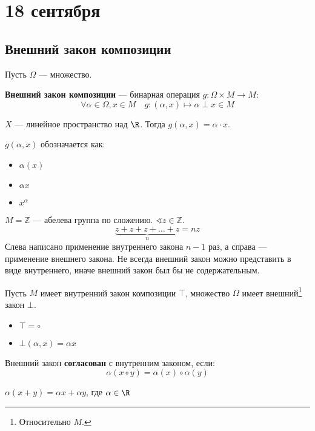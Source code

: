 \chapter{18 сентября}

\section{Внешний закон композиции}

Пусть \(\Omega\) --- множество.
\begin{definition}
    \textbf{Внешний закон композиции} --- бинарная операция \(g : \Omega \times M \to M\):
    \[\forall \alpha \in \Omega, x \in M \quad g : (\alpha, x) \mapsto \alpha \perp x \in M\]
\end{definition}
\begin{example}
    \(X\) --- линейное пространство над \(\R\). Тогда \(g(\alpha, x) = \alpha \cdot x\).
\end{example}
\begin{obozn}
    \(g(\alpha, x)\) обозначается как:
    \begin{itemize}
        \item \(\alpha(x)\)
        \item \(\alpha x\)
        \item \(x^\alpha\)
    \end{itemize}
\end{obozn}

\begin{example}
    \(M = \mathbb{Z}\) --- абелева группа по сложению. \(\sphericalangle z \in \mathbb{Z}\).
    \[\underbrace{z + z + z + \dots + z}_n = nz\]
    Слева написано применение внутреннего закона \(n - 1\) раз, а справа --- применение внешнего закона. Не всегда внешний закон можно представить в виде внутреннего, иначе внешний закон был бы не содержательным.
\end{example}

Пусть \(M\) имеет внутренний закон композиции \(\top\), множество \(\Omega\) имеет внешний\footnote{Относительно \(M\).} закон \(\bot\).
\begin{obozn}\itemfix
    \begin{itemize}
        \item \(\top = \circ\)
        \item \(\bot(\alpha, x) = \alpha x\)
    \end{itemize}
\end{obozn}
\begin{definition}
    Внешний закон \textbf{согласован} с внутренним законом, если:
    \[\alpha(x \circ y) = \alpha(x) \circ \alpha(y)\]
\end{definition}
\begin{example}
    \(\alpha(x + y) = \alpha x + \alpha y\), где \(\alpha \in \R\)
\end{example}

